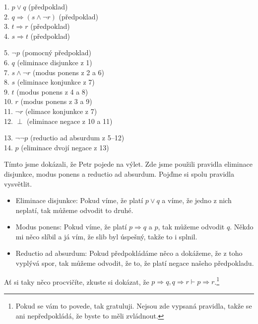 \begin{example}
  \begin{proofbox}
    1. $p \lor q$ (předpoklad) \\
    2. $q \Rightarrow (s \land \neg r)$ (předpoklad) \\
    3. $t \Rightarrow r$ (předpoklad) \\
    4. $s \Rightarrow t$ (předpoklad) 
  \begin{proofbox}
    5. $\neg p$ (pomocný předpoklad) \\
    6. $q$ (eliminace disjunkce z 1) \\
    7. $s \land \neg r$ (modus ponens z 2 a 6) \\
    8. $s$ (eliminace konjunkce z 7) \\
    9. $t$ (modus ponens z 4 a 8) \\
    10. $r$ (modus ponens z 3 a 9) \\
    11. $\neg r$ (elimace konjunkce z 7) \\
    12. $\perp$ (eliminace negace z 10 a 11)
  \end{proofbox}
    13. $\lnot\lnot p$ (reductio ad absurdum z 5--12) \\
    14. $p$ (eliminace dvojí negace z 13)
  \end{proofbox}
  Tímto jsme dokázali, že Petr pojede na výlet. Zde jsme použili pravidla eliminace disjunkce, modus ponens a reductio ad absurdum. Pojďme si spolu pravidla vysvětlit. 
  \begin{itemize}
    \item Eliminace disjunkce: Pokud víme, že platí $p \lor q$ a víme, že jedno z nich neplatí, tak můžeme odvodit to druhé. 
    \item Modus ponens: Pokud víme, že platí $p \Rightarrow q$ a $p$, tak můžeme odvodit $q$. Někdo mi něco slíbil a já vím, že slib byl úspešný, takže to i splnil.
    \item Reductio ad absurdum: Pokud předpokládáme něco a dokážeme, že z toho vyplývá spor, tak můžeme odvodit, že to, že platí negace našeho předpokladu.
  \end{itemize}
\end{example}

\begin{problem}
  Ať si taky něco procvičíte, zkuste si dokázat, že $p \Rightarrow q, q \Rightarrow r \vdash p \Rightarrow r$.\footnote{Pokud se vám to povede, tak gratuluji. Nejsou zde vypsaná pravidla, takže se ani nepředpokládá, že byste to měli zvládnout.}
\end{problem}


